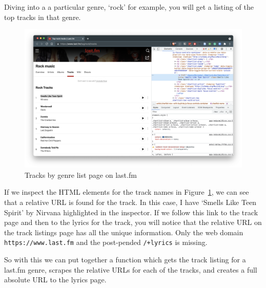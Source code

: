 \documentclass[
  letterpaper,
]{scrbook}
\begin{document}
Diving into a a particular genre, `rock' for example, you will get a
listing of the top tracks in that genre.

\begin{figure}[h]

{\centering \includegraphics[width=9.28in,height=\textheight]{./figures/acquire-data/ad-lastfm-genre-tracks-list.png}

}

\caption{\label{fig-ad-genre-tracks-list-lastfm}Tracks by genre list
page on last.fm}

\end{figure}

If we inspect the HTML elements for the track names in
Figure~\ref{fig-ad-genre-tracks-list-lastfm}, we can see that a relative
URL is found for the track. In this case, I have `Smells Like Teen
Spirit' by Nirvana highlighted in the inspector. If we follow this link
to the track page and then to the lyrics for the track, you will notice
that the relative URL on the track listings page has all the unique
information. Only the web domain \texttt{https://www.last.fm} and the
post-pended \texttt{/+lyrics} is missing.

So with this we can put together a function which gets the track listing
for a last.fm genre, scrapes the relative URLs for each of the tracks,
and creates a full absolute URL to the lyrics page.
\end{document}
